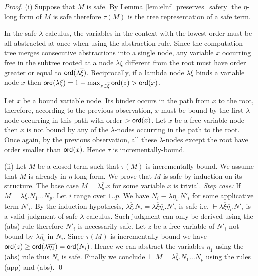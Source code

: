 \documentclass{llncs}
\begin{document}
\begin{proof}
  (i) Suppose that $M$ is safe. By Lemma
  \ref{lem:elnf_preserves_safety} the $\eta$-long form of $M$ is safe
  therefore $\tau(M)$ is the tree representation of a safe term.

In the safe $\lambda$-calculus, the variables in the context with the
lowest order must be all abstracted at once when using the abstraction
rule. Since the computation tree merges consecutive abstractions into
a single node, any variable $x$ occurring free in the subtree rooted
at a node $\lambda \overline{\xi}$ different from the root must have
order greater or equal to ${\sf ord}(\lambda
  \overline{\xi})$. Reciprocally, if a lambda node $\lambda
\overline{\xi}$ binds a variable node $x$ then ${\sf ord}(\lambda
  \overline{\xi}) = 1+\max_{z\in\overline{\xi}} {\sf ord}(z) > {\sf ord}(x)$.

Let $x$ be a bound variable node. Its binder occurs in the path from
$x$ to the root, therefore, according to the previous observation, $x$
must be bound by the first $\lambda$-node occurring in this path with
order $>{\sf ord}(x)$. Let $x$ be a free variable node then $x$ is not
bound by any of the $\lambda$-nodes occurring in the path to the
root. Once again, by the previous observation, all these
$\lambda$-nodes except the root have order smaller than
${\sf ord}(x)$. Hence $\tau$ is incrementally-bound.

(ii) Let $M$ be a closed term such that $\tau(M)$ is
incrementally-bound.  We assume that $M$ is already in $\eta$-long
form.  We prove that $M$ is safe by induction on its structure. The
base case $M = \lambda \overline{\xi} . x$ for some variable $x$ is
trivial.  \emph{Step case:} If $M = \lambda \overline{\xi} . N_1
\ldots N_p$.  Let $i$ range over $1..p$. We have $N_i \equiv \lambda
\overline{\eta_i} . N'_i$ for some applicative term $N'_i$. By the
induction hypothesis, $\lambda \overline{\xi} . N_i = \lambda
\overline{\xi} \overline{\eta_i} . N'_i$ is safe i.e. $\vdash \lambda
\overline{\xi} \overline{\eta_i} . N'_i$ is a valid judgment of safe
$\lambda$-calculus.  Such judgment can only be derived using the (abs)
rule therefore $N'_i$ is necessarily safe. Let $z$ be a free variable
of $N'_i$ not bound by $\lambda \overline{\eta_i}$ in $N_i$. Since
$\tau(M)$ is incrementally-bound we have ${\sf ord}(z) \geq {\sf ord}(\lambda
  \overline{\eta_1}) = {\sf ord}(N_i)$. Hence we can abstract the variables
$\overline{\eta_1}$ using the (abs) rule thus $N_i$ is safe.  Finally
we conclude $\vdash M = \lambda \overline{\xi} . N_1 \ldots N_p$ using
the rules (app) and (abs).  \qed
\end{proof}
\end{document}
